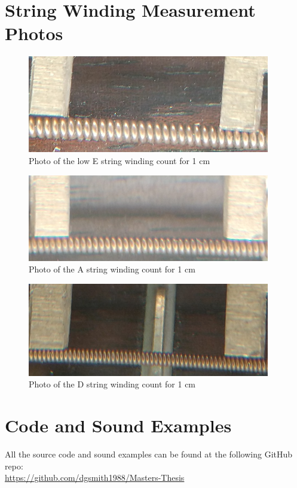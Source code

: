 \documentclass[../main.tex]{subfiles}
\begin{document}
\appendix

\chapter{String Winding Measurement Photos}
\label{apen:StringWindingPhotos}

\begin{figure}[h]
    \centering
    \includegraphics[scale=1]{./images/pictures/WindingsEZoom.png}
    \caption{Photo of the low E string winding count for 1 cm}
    \label{fig:EStringWindings}
\end{figure}

\begin{figure}[h]
    \centering
    \includegraphics[scale=1]{./images/pictures/WindingsAZoom.png}
    \caption{Photo of the A string winding count for 1 cm}
    \label{fig:AStringWindings}
\end{figure}

\begin{figure}[h]
    \centering
    \includegraphics[scale=.95]{./images/pictures/WindingsDZoom.png}
    \caption{Photo of the D string winding count for 1 cm}
    \label{fig:DStringWindings}
\end{figure}


\chapter{Code and Sound Examples}
\label{apen:CodeAndSound}
All the source code and sound examples can be found at the following GitHub repo:\\
\url{https://github.com/dgsmith1988/Masters-Thesis}
\end{document}
